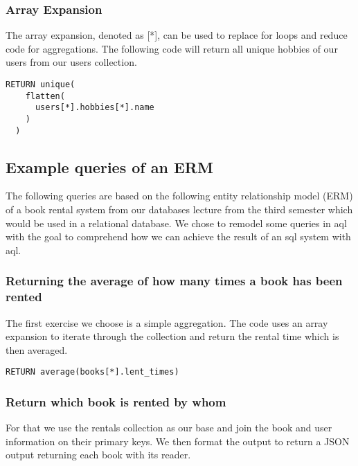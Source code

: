 \subsubsection{Array Expansion}

The array expansion, denoted as [*], can be used to replace for loops and reduce code for aggregations. The following code will return all unique hobbies of our users from our users collection.

\begin{lstlisting}[language=ArangoQL,label={lst:graph},caption={Array Expansion}]
  RETURN unique(
    flatten(
      users[*].hobbies[*].name
    )
  )
\end{lstlisting}

\subsection{Example queries of an ERM}

The following queries are based on the following entity relationship model (ERM) of a book rental system from our databases lecture from the third semester which would be used in a relational database. We chose to remodel some queries in \gls{aql} with the goal to comprehend how we can achieve the result of an \gls{sql} system with \gls{aql}.

\subsubsection{Returning the average of how many times a book has been rented}

The first exercise we choose is a simple aggregation. The code uses an array expansion to iterate through the collection and return the rental time which is then averaged.

\begin{lstlisting}[language=ArangoQL,label={lst:graph},caption={Returning the average of how many times a book has been rented}]
  RETURN average(books[*].lent_times)
\end{lstlisting}

\subsubsection{Return which book is rented by whom}

For that we use the rentals collection as our base and join the book and user information on their primary keys. We then format the output to return a JSON output returning each book with its reader.


